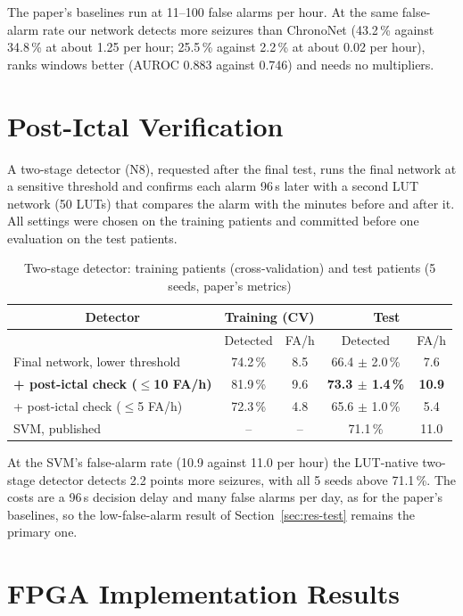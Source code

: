 The paper's baselines run at 11--100 false alarms per hour. At the same false-alarm rate our network detects more
seizures than ChronoNet (43.2\,\% against 34.8\,\% at about 1.25 per hour; 25.5\,\% against 2.2\,\% at about 0.02 per
hour), ranks windows better (AUROC 0.883 against 0.746) and needs no multipliers.

\section{Post-Ictal Verification}\label{sec:res-n8}

A two-stage detector (N8), requested after the final test, runs the final network at a sensitive threshold and
confirms each alarm 96\,s later with a second LUT network (50 LUTs) that compares the alarm with the minutes before and
after it. All settings were chosen on the training patients and committed before one evaluation on the test patients.

\begin{table}[H]
\centering\small
\caption{Two-stage detector: training patients (cross-validation) and test patients (5 seeds, paper's metrics)}\label{tab:n8}
\begin{tabular}{|l|c|c|c|c|}
\hline
\multicolumn{1}{|c|}{\textbf{Detector}} & \multicolumn{2}{c|}{\textbf{Training (CV)}} & \multicolumn{2}{c|}{\textbf{Test}}\\
\hline
 & Detected & FA/h & Detected & FA/h\\
\hline
Final network, lower threshold & 74.2\,\% & 8.5 & 66.4 $\pm$ 2.0\,\% & 7.6\\
\hline
\textbf{+ post-ictal check ($\le$10 FA/h)} & 81.9\,\% & 9.6 & \textbf{73.3 $\pm$ 1.4\,\%} & \textbf{10.9}\\
\hline
+ post-ictal check ($\le$5 FA/h) & 72.3\,\% & 4.8 & 65.6 $\pm$ 1.0\,\% & 5.4\\
\hline
SVM, published \cite{bhagubai2025seizeit2} & -- & -- & 71.1\,\% & 11.0\\
\hline
\end{tabular}
\end{table}

At the SVM's false-alarm rate (10.9 against 11.0 per hour) the LUT-native two-stage detector detects 2.2 points more
seizures, with all 5 seeds above 71.1\,\%. The costs are a 96\,s decision delay and many false alarms per day, as for
the paper's baselines, so the low-false-alarm result of Section~\ref{sec:res-test} remains the primary one.

\section{FPGA Implementation Results}\label{sec:res-fpga}

